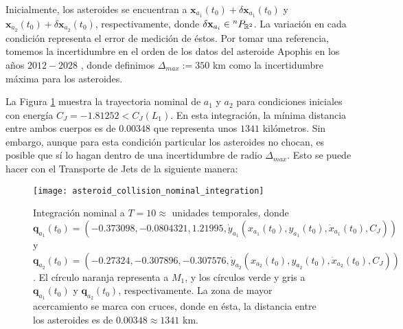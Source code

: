 Inicialmente, los asteroides se encuentran a $\mathbf{x}_{a_1}(t_0) + \delta\mathbf{x}_{a_1}(t_0)$  y $\mathbf{x}_{a_2}(t_0) + \delta\mathbf{x}_{a_2}(t_0)$, respectivamente, donde $\delta\mathbf{x}_{a_i} \in {^{n}P_{\mathbb{R}^ 2} }$. La variación en cada condición representa el error de medición de éstos. Por tomar una referencia, tomemos la incertidumbre en el orden de los datos del asteroide Apophis en los años $2012 - 2028$ \cite{Desmars2013}, donde definimos $\Delta_{max} := 350 $ km como la incertidumbre máxima para los asteroides.

La Figura \ref{fig:asteroid_collision_nominal_integration} muestra la trayectoria nominal de $a_1$ y $a_2$ para condiciones iniciales con energía $C_J = -1.81252 < C_J(L_1)$. En esta integración, la mínima distancia entre ambos cuerpos es de $0.00348$ que representa unos $1341$ kilómetros. Sin embargo, aunque para esta condición particular los asteroides no chocan, es posible que sí lo hagan dentro de una incertidumbre de radio $\Delta_{max}$. Esto se puede hacer con el Transporte de Jets de la siguiente manera: 

\begin{figure}
 \centering
 \texttt{[image: asteroid\_collision\_nominal\_integration]}
 \caption{Integración nominal a $T=10 \approx $ unidades temporales, donde $\mathbf{q}_{a_1}(t_0) = \left( -0.373098, -0.0804321, 1.21995, \dot{y}_{a_1} \left( x_{a_1}(t_0), y_{a_1}(t_0), \dot{x}_{a_1}(t_0), C_J \right) \right)$ 
 y $\mathbf{q}_{a_2}(t_0) = \left( -0.27324, -0.307896, -0.307576, \dot{y}_{a_2} \left( x_{a_2}(t_0), y_{a_2}(t_0), \dot{x}_{a_2}(t_0), C_J \right) \right)$. El círculo naranja representa a $M_1$, y los círculos verde y gris a $\mathbf{q}_{a_1}(t_0)$ y $\mathbf{q}_{a_2}(t_0)$, respectivamente. La zona de mayor acercamiento se marca con cruces, donde en ésta, la distancia entre los asteroides es de $0.00348 \approx 1341$ km.}
 \label{fig:asteroid_collision_nominal_integration}
\end{figure}


